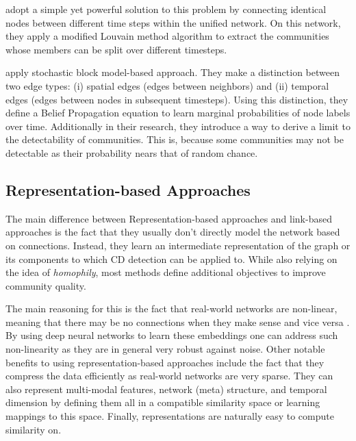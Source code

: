 \documentclass[
acmsmall,
nonacm,
screen,
acmthm]{acmart}
\begin{document}
\citet{muchaCommunityStructureTimeDependent2009} adopt a simple yet
powerful solution to this problem by connecting identical nodes between
different time steps within the unified network. On this network, they
apply a modified Louvain method algorithm to extract the communities
whose members can be split over different timesteps.

\citet{ghasemianDetectabilityThresholdsOptimal2016} apply stochastic
block model-based approach. They make a distinction between two edge
types: (i) spatial edges (edges between neighbors) and (ii) temporal
edges (edges between nodes in subsequent timesteps). Using this
distinction, they define a Belief Propagation equation to learn marginal
probabilities of node labels over time. Additionally in their research,
they introduce a way to derive a limit to the detectability of
communities. This is, because some communities may not be detectable as
their probability nears that of random chance.

\hypertarget{representation-based-approaches}{%
\subsection{Representation-based
Approaches}\label{representation-based-approaches}}

The main difference between Representation-based approaches and
link-based approaches is the fact that they usually don't directly model
the network based on connections. Instead, they learn an intermediate
representation of the graph or its components to which CD detection can
be applied to. While also relying on the idea of \emph{homophily}, most
methods define additional objectives to improve community quality.

The main reasoning for this is the fact that real-world networks are
non-linear, meaning that there may be no connections when they make
sense and vice versa \citep{wangEvolutionaryAutoencoderDynamic2020}. By
using deep neural networks to learn these embeddings one can address
such non-linearity as they are in general very robust against noise.
Other notable benefits to using representation-based approaches include
the fact that they compress the data efficiently as real-world networks
are very sparse. They can also represent multi-modal features, network
(meta) structure, and temporal dimension by defining them all in a
compatible similarity space or learning mappings to this space. Finally,
representations are naturally easy to compute similarity on.
\end{document}

